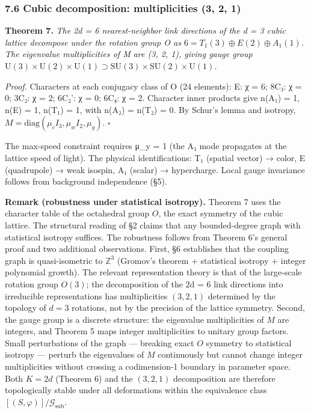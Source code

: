 \documentclass[
  11pt,
]{article}
\begin{document}
\hypertarget{cubic-decomposition-multiplicities-3-2-1}{%
\subsubsection{7.6 Cubic decomposition: multiplicities (3, 2,
1)}\label{cubic-decomposition-multiplicities-3-2-1}}

\textbf{Theorem 7.} \emph{The 2d = 6 nearest-neighbor link directions of
the d = 3 cubic lattice decompose under the rotation group O as
\(6 = T_1(3) \oplus E(2) \oplus A_1(1)\). The eigenvalue multiplicities
of M are (3, 2, 1), giving gauge group
\(\mathrm{U}(3) \times \mathrm{U}(2) \times \mathrm{U}(1) \supset \mathrm{SU}(3) \times \mathrm{SU}(2) \times \mathrm{U}(1)\).}

\emph{Proof.} Characters at each conjugacy class of O (24 elements): E:
χ = 6; 8C₃: χ = 0; 3C₂: χ = 2; 6C₂': χ = 0; 6C₄: χ = 2. Character inner
products give n(A₁) = 1, n(E) = 1, n(T₁) = 1, with n(A₂) = n(T₂) = 0. By
Schur's lemma and isotropy,
\(M = \mathrm{diag}(\mu_c I_3, \mu_w I_2, \mu_y)\). \(\square\)

The max-speed constraint requires μ\_y = 1 (the A₁ mode propagates at
the lattice speed of light). The physical identifications: T₁ (spatial
vector) → color, E (quadrupole) → weak isospin, A₁ (scalar) →
hypercharge. Local gauge invariance follows from background independence
(§5).

\textbf{Remark (robustness under statistical isotropy).} Theorem 7 uses
the character table of the octahedral group \(O\), the exact symmetry of
the cubic lattice. The structural reading of §2 claims that any
bounded-degree graph with statistical isotropy suffices. The robustness
follows from Theorem 6's general proof and two additional observations.
First, §6 establishes that the coupling graph is quasi-isometric to
\(\mathbb{Z}^3\) (Gromov's theorem + statistical isotropy + integer
polynomial growth). The relevant representation theory is that of the
large-scale rotation group \(O(3)\); the decomposition of the 2d = 6
link directions into irreducible representations has multiplicities
\((3, 2, 1)\) determined by the topology of \(d = 3\) rotations, not by
the precision of the lattice symmetry. Second, the gauge group is a
discrete structure: the eigenvalue multiplicities of \(M\) are integers,
and Theorem 5 maps integer multiplicities to unitary group factors.
Small perturbations of the graph --- breaking exact \(O\) symmetry to
statistical isotropy --- perturb the eigenvalues of \(M\) continuously
but cannot change integer multiplicities without crossing a
codimension-1 boundary in parameter space. Both \(K = 2d\) (Theorem 6)
and the \((3, 2, 1)\) decomposition are therefore topologically stable
under all deformations within the equivalence class
\([(S, \varphi)]/\mathcal{G}_{\text{sub}}\).
\end{document}

